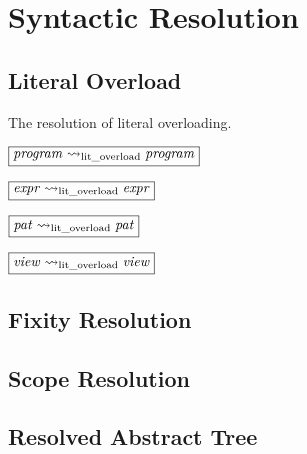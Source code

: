 \chapter{Syntactic Resolution}

\section{Literal Overload}

The resolution of literal overloading.

$\fbox{$\mathit{program} \rightsquigarrow_\mathrm{lit\_overload} \mathit{program}$}$

$\fbox{$\mathit{expr} \rightsquigarrow_\mathrm{lit\_overload} \mathit{expr}$}$

$\fbox{$\mathit{pat} \rightsquigarrow_\mathrm{lit\_overload} \mathit{pat}$}$

$\fbox{$\mathit{view} \rightsquigarrow_\mathrm{lit\_overload} \mathit{view}$}$

\section{Fixity Resolution}

\section{Scope Resolution}

\section{Resolved Abstract Tree}
